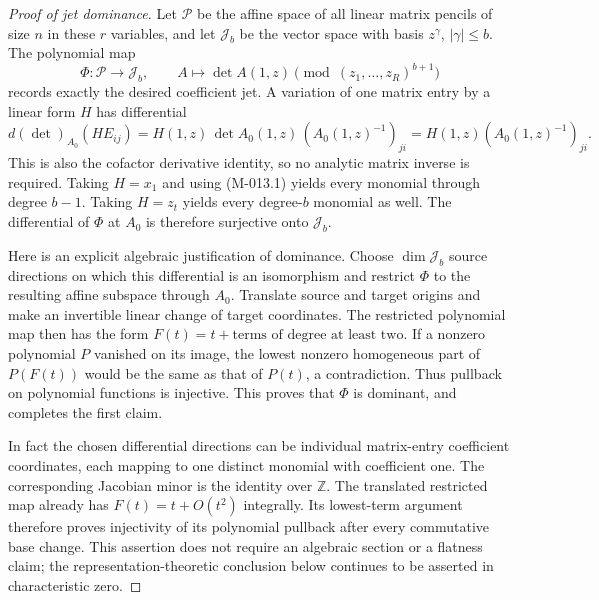 \begin{proof}[Proof of jet dominance]
Let \(\mathcal P\) be the affine space of all linear matrix
pencils of size \(n\) in these \(r\) variables, and let
\(\mathcal J_b\) be the vector space with basis
\(z^\gamma\), \(|\gamma|\leq b\). The polynomial map
\[
 \Phi:\mathcal P\longrightarrow\mathcal J_b,
 \qquad A\longmapsto\det A(1,z)\pmod{(z_1,\ldots,z_R)^{b+1}}
\]
records exactly the desired coefficient jet. A variation of
one matrix entry by a linear form \(H\) has differential
\[
 d(\det)_{A_0}(H E_{ij})
       =H(1,z)\,\det A_0(1,z)\,(A_0(1,z)^{-1})_{ji}
       =H(1,z)(A_0(1,z)^{-1})_{ji}.
\]
This is also the cofactor derivative identity, so no analytic
matrix inverse is required. Taking \(H=x_1\) and using
(M-013.1) yields every monomial through degree \(b-1\).
Taking \(H=z_t\) yields every degree-\(b\) monomial as
well. The differential of \(\Phi\) at \(A_0\) is
therefore surjective onto \(\mathcal J_b\).

Here is an explicit algebraic justification of dominance.
Choose \(\dim\mathcal J_b\) source directions on which
this differential is an isomorphism and restrict \(\Phi\)
to the resulting affine subspace through \(A_0\). Translate
source and target origins and make an invertible linear change
of target coordinates. The restricted polynomial map then
has the form \(F(t)=t+\text{terms of degree at least two}\).
If a nonzero polynomial \(P\) vanished on its image, the
lowest nonzero homogeneous part of \(P(F(t))\) would be
the same as that of \(P(t)\), a contradiction. Thus
pullback on polynomial functions is injective. This proves
that \(\Phi\) is dominant, and completes the first claim.

In fact the chosen differential directions can be individual
matrix-entry coefficient coordinates, each mapping to one distinct
monomial with coefficient one. The corresponding Jacobian minor
is the identity over \(\mathbb Z\). The translated restricted map
already has \(F(t)=t+O(t^2)\) integrally. Its lowest-term argument
therefore proves injectivity of its polynomial pullback after
every commutative base change. This assertion does not require
an algebraic section or a flatness claim; the representation-theoretic
conclusion below continues to be asserted in characteristic zero.
\end{proof}

